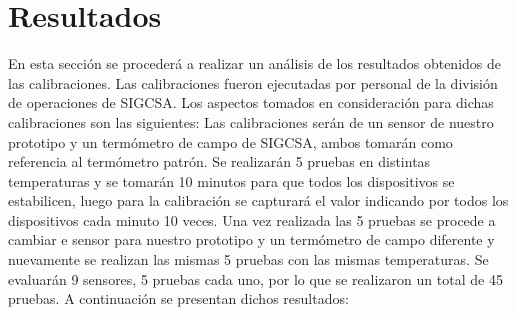 \section{Resultados}

\par 
En esta sección se procederá a realizar un análisis de los resultados obtenidos de las calibraciones. Las calibraciones fueron ejecutadas por personal de la división de operaciones de SIGCSA. Los aspectos tomados en consideración para dichas calibraciones son las siguientes: Las calibraciones serán de un sensor de nuestro prototipo y un termómetro de campo de SIGCSA, ambos tomarán como referencia al termómetro patrón. Se realizarán 5 pruebas en distintas temperaturas y se tomarán 10 minutos para que todos los dispositivos se estabilicen, luego para la calibración se capturará el valor indicando por todos los dispositivos cada minuto 10 veces. Una vez realizada las 5 pruebas se procede a cambiar e sensor para nuestro prototipo y un termómetro de campo diferente y nuevamente se realizan las mismas 5 pruebas con las mismas temperaturas. Se evaluarán 9 sensores, 5 pruebas cada uno, por lo que se realizaron un total de 45 pruebas. A continuación se presentan dichos resultados: 











\clearpage
